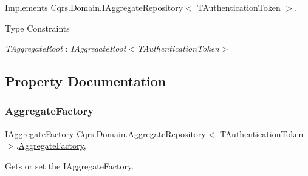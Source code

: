 Implements \hyperlink{interfaceCqrs_1_1Domain_1_1IAggregateRepository_a306baf8aa6faabe893f93e5db5d3517d_a306baf8aa6faabe893f93e5db5d3517d}{Cqrs.\+Domain.\+I\+Aggregate\+Repository$<$ T\+Authentication\+Token $>$}.

\begin{Desc}
\item[Type Constraints]\begin{description}
\item[{\em T\+Aggregate\+Root} : {\em I\+Aggregate\+Root$<$T\+Authentication\+Token$>$}]\end{description}
\end{Desc}


\subsection{Property Documentation}
\mbox{\label{classCqrs_1_1Domain_1_1AggregateRepository_a9c2ffdf87ba242cf0c540f4b0d020777_a9c2ffdf87ba242cf0c540f4b0d020777}} 
\subsubsection{\texorpdfstring{Aggregate\+Factory}{AggregateFactory}}
{\footnotesize\ttfamily \hyperlink{interfaceCqrs_1_1Domain_1_1Factories_1_1IAggregateFactory}{I\+Aggregate\+Factory} \hyperlink{classCqrs_1_1Domain_1_1AggregateRepository}{Cqrs.\+Domain.\+Aggregate\+Repository}$<$ T\+Authentication\+Token $>$.\hyperlink{classCqrs_1_1Domain_1_1Factories_1_1AggregateFactory}{Aggregate\+Factory}\hspace{0.3cm}{\ttfamily [get]}, {\ttfamily [protected]}}



Gets or set the I\+Aggregate\+Factory. 

\mbox{\label{classCqrs_1_1Domain_1_1AggregateRepository_acc91846378f7b76e0549586fc64d3e91_acc91846378f7b76e0549586fc64d3e91}} 
